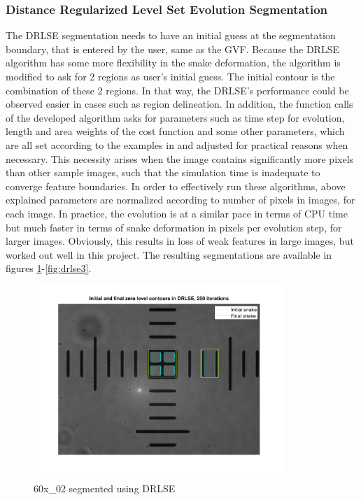 \documentclass{article}
\begin{document}
\subsubsection*{Distance Regularized Level Set Evolution Segmentation}
The DRLSE segmentation needs to have an initial guess at the segmentation boundary, that is entered by the user, same as the GVF. Because the DRLSE algorithm has some more flexibility in the snake deformation, the algorithm is modified to ask for 2 regions as user's initial guess. The initial contour is the combination of these 2 regions. In that way, the DRLSE's performance could be observed easier in cases such as region delineation. In addition, the function calls of the developed algorithm asks for parameters such as time step for evolution, length and area weights of the cost function and some other parameters, which are all set according to the examples in \cite{gvf} and adjusted for practical reasons when necessary. This necessity arises when the image contains significantly more pixels than other sample images, such that the simulation time is inadequate to converge feature boundaries. In order to effectively run these algorithms, above explained parameters are normalized according to number of pixels in images, for each image. In practice, the evolution is at a similar pace in terms of CPU time but much faster in terms of snake deformation in pixels per evolution step, for larger images. Obviously, this results in loss of weak features in large images, but worked out well in this project. The resulting segmentations are available in figures \ref{fig:drlse1}-\ref{fig:drlse3}. 

\begin{figure}
\centering
\includegraphics[width=0.85\textwidth]{figures/drlse1.pdf}
\caption{60x\_02 segmented using DRLSE}
\label{fig:drlse1}
\end{figure}
\end{document}
